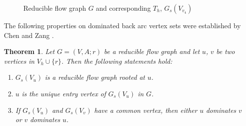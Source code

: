 \documentclass[11pt]{article}
\newtheorem{theorem}{Theorem}[section]
\begin{document}
\begin{figure}
{\begin{minipage}[t]{0.33\linewidth}
          \label{fig:2b}
    \end{minipage}}
    \caption{Reducible flow graph $G$ and corresponding $T_h$, $G_s(V_{v_4})$}
     \label{fig:2}
 \end{figure}

The following properties on dominated back arc vertex sets were established by Chen and Zang \cite{CheZ}.

\begin{theorem}
\label{thm:2}
Let $G=(V,A;r)$ be a reducible flow graph and let $u$, $v$ be two vertices in $V_h\cup\{r\}$. Then the following statements hold:
\begin{enumerate}[label=\emph{(}\alph*\emph{)}]
  \item $G_s(V_u)$ is a reducible flow graph rooted at $u$.
  \item $u$ is the unique entry vertex of $G_s(V_u)$ in $G$.
  \item If $G_s(V_u)$ and $G_s(V_v)$ have a common vertex, then either $u$ dominates $v$ or $v$ dominates $u$.
\end{enumerate}
\end{theorem}
\end{document}
